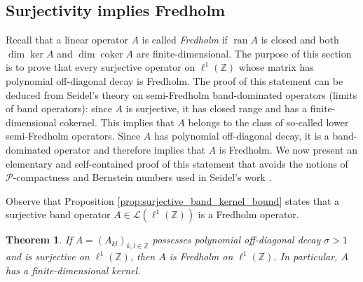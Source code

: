 \documentclass[reqno,a4paper,12pt]{amsart}
\numberwithin{equation}{section}
\newtheorem{theorem}[definition]{Theorem}
\def\Z{{\mathbb Z}}
\newcommand\1{\mathds{1}}
\begin{document}
\subsection{Surjectivity implies Fredholm}

Recall that a linear operator $A$ is called \emph{Fredholm} if $\operatorname{ran}A$ is closed and both $\dim\ker A$ and $\dim\operatorname{coker}A$ are finite-dimensional.
The purpose of this section is to prove that every surjective operator
on $\ell^1(\Z)$ whose matrix has polynomial off-diagonal decay is
Fredholm. The proof of this statement can be deduced from Seidel's
theory on semi-Fredholm band-dominated operators (limits of band
operators): since $A$ is surjective, it has closed range and has a
finite-dimensional cokernel. This implies that $A$ belongs to the
class of so-called lower semi-Fredholm operators. Since $A$ has
polynomial off-diagonal decay, it is a band-dominated operator and
therefore \cite[Thm.~4.3]{seidel2015semi} implies that $A$ is
Fredholm. We now present an elementary and self-contained proof  of
this statement that avoids the notions of $\mathcal{P}$-compactness
and Bernstein numbers used in Seidel's work \cite{seidel2015semi}.  

Observe that Proposition \ref{prop:surjective_band_kernel_bound} states that a surjective band operator $A\in \mathcal{L}(\ell^1(\Z))$ is a Fredholm operator.
\begin{theorem}\label{thm:surjectivity_implies_Fredholm}
If $A = (A_{kl})_{k,l \in \Z}$ possesses  polynomial off-diagonal
decay $\sigma >1$ and  is surjective on $\ell^1(\Z)$, then $A$ is Fredholm on $\ell^1(\Z)$. In particular, $A$ has a finite-dimensional kernel. 
\end{theorem}
\end{document}
